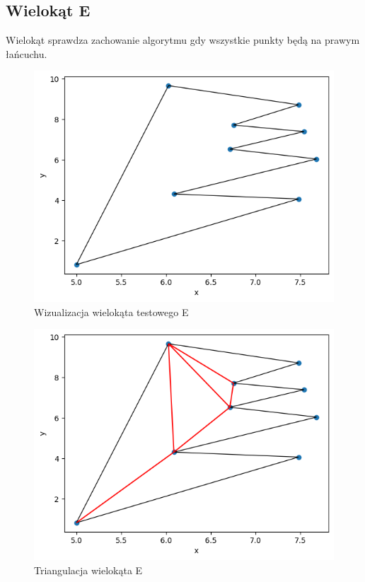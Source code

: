 \documentclass[a4paper]{article}
\begin{document}
    \subsection{Wielokąt E}
    Wielokąt sprawdza zachowanie algorytmu gdy wszystkie punkty będą na prawym łańcuchu.
    \begin{figure}[H]
        \centering
        \includegraphics[width=.65\textwidth]{test_e_poly.png}
        \caption{Wizualizacja wielokąta testowego E}
        \label{fig:test_e_poly}
    \end{figure}
    \begin{figure}[H]
        \centering
        \includegraphics[width=.65\textwidth]{test_e_tri.png}
        \caption{Triangulacja wielokąta E}
        \label{fig:test_e_tri}
    \end{figure}
    
\end{document}
